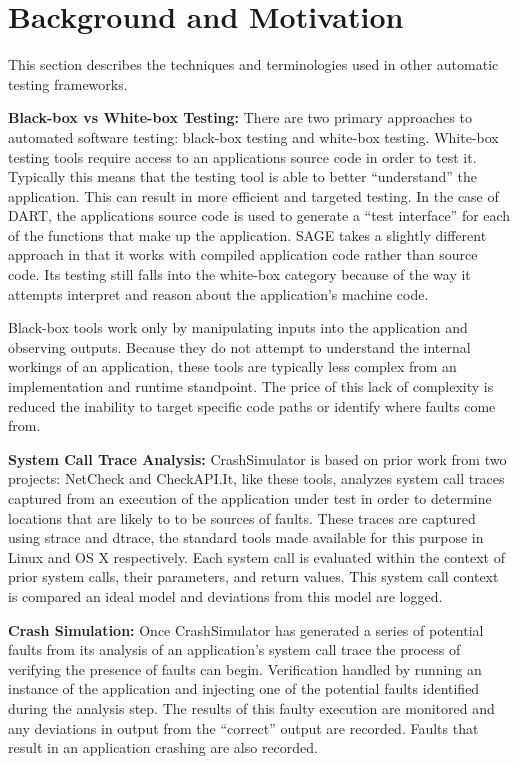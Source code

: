 \section{Background and Motivation}

    This section describes the techniques and terminologies used in other automatic testing frameworks.

    \textbf{Black-box vs White-box Testing:} There are two primary approaches to automated software testing: black-box
    testing and white-box testing. White-box testing tools require access to an applications source code in order to test
    it. Typically this means that the testing tool is able to better ``understand'' the application. This can result in more
    efficient and targeted testing. In the case of DART, the applications source code is used to generate a ``test
    interface'' for each of the functions that make up the application. SAGE takes a slightly different approach in that it
    works with compiled application code rather than source code. Its testing still falls into the white-box category
    because of the way it attempts interpret and reason about the application's machine code.

    Black-box tools work only by manipulating inputs into the application and observing outputs. Because they do not
    attempt to understand the internal workings of an application, these tools are typically less complex from an
    implementation and runtime standpoint. The price of this lack of complexity is reduced the inability to target
    specific code paths or identify where faults come from.

    \textbf{System Call Trace Analysis:} CrashSimulator is based on prior work from two projects: NetCheck and
    CheckAPI.\@  It, like these tools, analyzes system call traces captured from an execution of the application under
    test in order to determine locations that are likely to to be sources of faults. These traces are captured using
    strace and dtrace, the standard tools made available for this purpose in Linux and OS X respectively. Each system
    call is evaluated within the context of prior system calls, their parameters, and return values. This system call
    context is compared an ideal model and deviations from this model are logged.

    \textbf{Crash Simulation:} Once CrashSimulator has generated a series of potential faults from its analysis of an
    application's system call trace the process of verifying the presence of faults can begin. Verification handled by
    running an instance of the application and injecting one of the potential faults identified during the analysis
    step.  The results of this faulty execution are monitored and any deviations in output from the ``correct'' output
    are recorded. Faults that result in an application crashing are also recorded.

